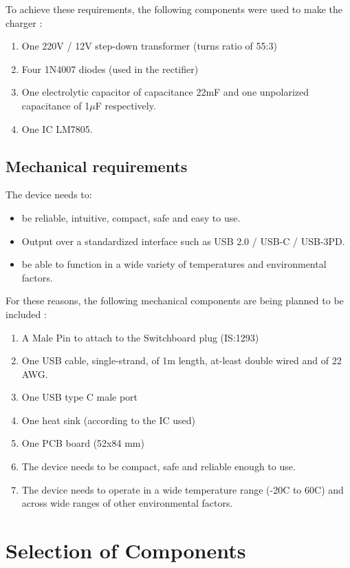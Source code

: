 \documentclass{article}
\begin{document}
To achieve these requirements, the following components\cite{noauthor_diy_nodate} were used to make the charger :

\begin{enumerate}
    \item One 220V / 12V step-down transformer (turns ratio of 55:3) 
    \item Four 1N4007 diodes (used in the rectifier)
    \item One electrolytic capacitor of capacitance 22mF and one unpolarized capacitance of 1$\mu$F respectively.

    \item One IC LM7805.
\end{enumerate}

\subsection{Mechanical requirements}
The device needs to:
\begin{itemize}
    \item be reliable, intuitive, compact, safe and easy to use. 
    \item Output over a standardized interface such as USB 2.0 / USB-C / USB-3PD.
    \item be able to function in a wide variety of temperatures and environmental factors.
\end{itemize}
For these reasons, the following mechanical components are being planned to be included :

\begin{enumerate}
    \item A Male Pin to attach to the Switchboard plug (IS:1293) 
    \item One USB cable, single-strand, of 1m length, at-least double wired and of 22 AWG.
    \item One USB type C male port
    \item One heat sink (according to the IC used)
    \item One PCB board (52x84 mm)
    \item The device needs to be compact, safe and reliable enough to use. 
    \item The device needs to operate in a wide temperature range (-20C to 60C) and across wide ranges of other environmental factors.  
\end{enumerate}

\section{Selection of Components}
\end{document}
